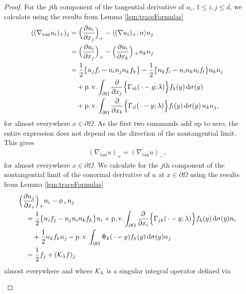 \begin{proof}
  For the $j$th component of the tangential derivative of $u_i$, $1\leq i,j \leq d$, we calculate using the results from Lemma \ref{lem:traceFormulas}
  \begin{align*}
    ((\nabla_{\mathrm{tan}} u_i)_+)_j
    &= \Big(\frac{\partial u_i}{\partial x_j}\Big)_+ - \langle (\nabla u_i)_+, n \rangle n_j \\
    &= \Big(\frac{\partial u_i}{\partial x_j} \Big)_+ - \Big(\frac{\partial u_i}{\partial x_k} \Big)\,_+ n_k n_j \\
    &= \frac{1}{2} \big\{ n_j f_i - n_i n_j n_k f_k\big\} - \frac{1}{2} \big\{ n_k f_i - n_i n_k n_l f_l \big\} n_k n_j  \\
    &\quad+ \operatorname{p. v.} \int_{\partial\Omega} \frac{\partial}{\partial x_j} \Big\{ \Gamma_{ik} (\,\cdot - y; \lambda) \Big\} f_k(y) \, {\operatorname{d}\!{\sigma}}(y) \\
    &\quad+ \operatorname{p. v.} \int_{\partial\Omega} \frac{\partial}{\partial x_k} \Big\{ \Gamma_{il} (\,\cdot - y; \lambda) \Big\} f_l(y) \, {\operatorname{d}\!{\sigma}}(y) \, n_k n_j,
  \end{align*}
  for almost everywhere $x \in \partial\Omega$.
  As the first two summands add up to zero, the entire expression does not depend on the direction of the nontangential limit. 
  This gives
  \begin{align*}
    (\nabla_{\mathrm{tan}} u)_+ = (\nabla_{\mathrm{tan}} u)_-,
  \end{align*}
  for almost everywhere $x \in \partial\Omega$.
  We calculate for the $j$th component of the nontangential limit of the conormal derivative of $u$ at $x \in \partial\Omega$ using the results from Lemma \ref{lem:traceFormulas}
  \begin{align*}
    &\Big(\frac{\partial u_j}{\partial x_i}\Big)_+ n_i - \phi_+ n_j\\
    &\quad= \frac{1}{2} \big\{ n_i f_j - n_j n_i n_k f_k \big\} n_i + \operatorname{p. v.} \int_{\partial\Omega} \frac{\partial}{\partial{x_i}} \Big\{ \Gamma_{jk}(\,\cdot - y; \lambda) \Big\} f_k(y) \, {\operatorname{d}\!{\sigma}}(y) n_i \\
    &\qquad+ \frac{1}{2} n_k f_k n_j - \operatorname{p. v.} \int_{\partial\Omega} \Phi_k(\,\cdot - y) f_k(y) \, {\operatorname{d}\!{\sigma}}(y) n_j \\
    &\quad= \frac{1}{2} f_j + (\mathcal{K}_\lambda f)_j
  \end{align*}
  almost everywhere and where $\mathcal{K}_\lambda$ is a singular integral operator defined via
  \begin{align}
    \label{eq:defnKlambda}
    \begin{alignedat}{1}

\end{alignedat}
\end{align}
\end{proof}

